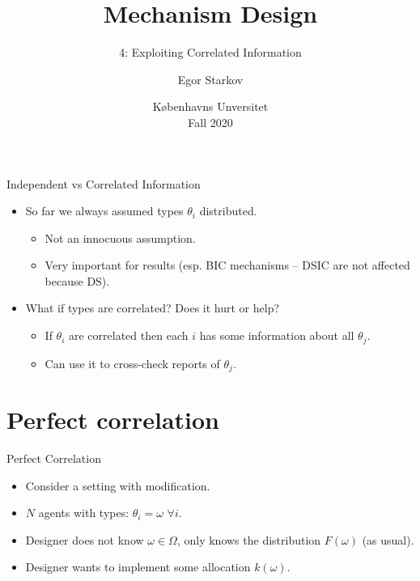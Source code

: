 \documentclass[english,10pt
,aspectratio=169
]{beamer}
\title{Mechanism Design}
\subtitle{4: Exploiting Correlated Information}
\author{Egor Starkov}
\date{K{\o}benhavns Unversitet \\
	Fall 2020}
\begin{document}
	\frame[plain]{\titlepage}



\begin{frame}{Independent vs Correlated Information}
\begin{itemize}
	\item So far we always assumed types $\theta_i$  distributed.
	\begin{itemize}
		\item Not an innocuous assumption.
		\item Very important for results (esp. BIC mechanisms -- DSIC are not affected because DS).
	\end{itemize}
	\item What if types are \alert{correlated}? Does it hurt or help?
	\begin{itemize}
		\item If $\theta_i$ are correlated then each $i$ has some information about all $\theta_j$.
		\item Can use it to cross-check reports of $\theta_j$.
	\end{itemize}
\end{itemize}
\end{frame}


\section{Perfect correlation}

\begin{frame}{Perfect Correlation}
\begin{itemize}
	\item Consider a  setting with modification.
	\item $N$ agents with  types: $\theta_i = \omega$ $\forall i$.
	\item Designer does not know $\omega \in \Omega$, only knows the distribution $F(\omega)$ (as usual).
	\item Designer wants to implement some allocation $k(\omega)$.
\end{itemize}
\end{frame}
\end{document}
